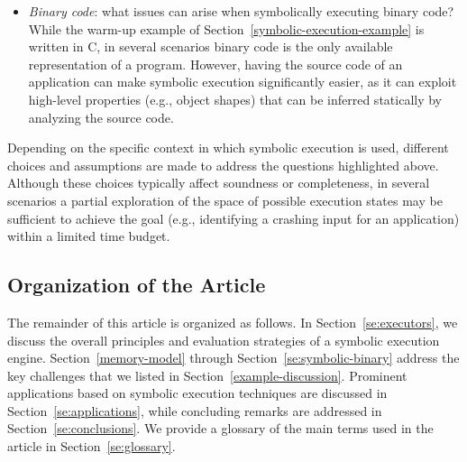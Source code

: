 \begin{itemize}
  \item {\em Binary code}: what issues can arise when symbolically executing binary code?
 While the warm-up example of Section~\ref{symbolic-execution-example} is written in C, in several scenarios binary code is the only available representation of a program. However, having the source code of an application can make symbolic execution significantly easier, as it can exploit high-level properties (e.g., object shapes) that can be inferred statically by analyzing the source code.
   
\end{itemize}
Depending on the specific context in which symbolic execution is used, different choices and assumptions are made to address the questions highlighted above. Although these choices typically affect soundness or completeness, in several scenarios a partial exploration of the space of possible execution states may be sufficient to achieve the goal (e.g., identifying a crashing input for an application) within a limited time budget.


\subsection{Organization of the Article}
\label{ss:article-organization}

The remainder of this article is organized as follows. In Section~\ref{se:executors}, we discuss the overall principles and evaluation strategies of a symbolic execution engine. Section~\ref{memory-model} through Section~\ref{se:symbolic-binary} address the key challenges that we listed in Section~\ref{example-discussion}. Prominent applications based on symbolic execution techniques are discussed in Section~\ref{se:applications}, while concluding remarks are addressed in Section~\ref{se:conclusions}. We provide a glossary of the main terms used in the article in Section~\ref{se:glossary}.

